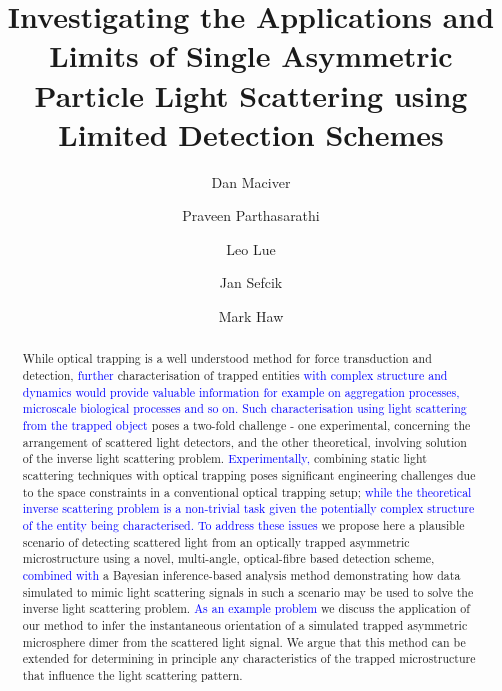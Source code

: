 \documentclass[final, 3p]{elsarticle}
\begin{document}
\begin{frontmatter}

\title{Investigating the Applications and Limits of Single Asymmetric Particle Light Scattering using Limited Detection Schemes}


\author[aff1]{Dan Maciver} 

\author[aff1]{Praveen Parthasarathi}

\author[aff1]{Leo Lue}

\author[aff1]{Jan Sefcik}

\author[aff1]{Mark Haw}






\begin{abstract}
\justifying
While optical trapping is a well understood method for force transduction and detection, \textcolor{blue}{ further} characterisation of trapped entities \textcolor{blue}{with complex structure and dynamics} \textcolor{blue}{ would provide valuable information for example on aggregation processes, microscale biological processes and so on. Such characterisation using light scattering from the trapped object} poses a two-fold challenge - one experimental, concerning the arrangement of scattered light detectors, and the other theoretical, involving solution of the inverse light scattering problem. \textcolor{blue} {Experimentally,} combining static light scattering techniques with optical trapping poses significant engineering challenges due to the space constraints in a conventional optical trapping setup;  \textcolor{blue} {while the theoretical inverse scattering problem is a non-trivial task given the potentially complex structure of the entity being characterised. To address these issues} we propose here a plausible scenario of detecting scattered light from an optically trapped asymmetric microstructure using a novel, multi-angle, optical-fibre based detection scheme, \textcolor{blue}{combined with}  a Bayesian inference-based analysis method demonstrating how data simulated to mimic light scattering signals in such a scenario may be used to solve the inverse light scattering problem. \textcolor{blue}{As an example problem} we discuss the application of our method to infer the instantaneous orientation of a simulated trapped asymmetric microsphere dimer from the scattered light signal. We argue that this method can be extended for determining in principle any characteristics of the trapped microstructure that influence the light scattering pattern.
\end{abstract}


\end{frontmatter}
\end{document}
